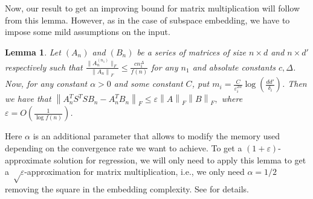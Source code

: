 \documentclass[a4paper,11pt,oneside,english,onecolumn]{article}
\newtheorem{lemma}[theorem]{Lemma}
\theoremstyle{definition}
\newcommand{\bigO}[1]{\ensuremath{O\left( #1 \right)}}
\newcommand{\normF}[1]{\ensuremath{\left\| #1\right\|_F}}
\newcommand{\eps}{\ensuremath{\varepsilon}}
\begin{document}
Now, our result to get an improving bound for matrix multiplication will follow from this lemma. However, as in the case of subspace embedding, we have to impose some mild assumptions on the input.

\begin{lemma}
\label{lemma:ImprovedmatrixMultiplication}
Let $(A_n)$ and $(B_n)$ be a series of matrices of size $n \times d $ and $n \times d'$ respectively such that
$\frac{\|A_n^{(n_1)}\|_F}{\normF{A_n}} \leq \frac{cn_1^\Delta}{f(n)}$
for any $n_1$ and absolute constants $c,\Delta$. Now, for any constant $\alpha>0$ and some constant $C$, put $m_i = \frac{C}{\eps_i^{2\alpha}} \log(\frac{dd'}{\delta_i})$. Then we have that
$\normF{A_n^T S^T S B_n - A_n^T B_n} \leq \eps \normF{A}\normF{B},$
where $\eps = \bigO{\frac{1}{\log f(n)}}$.
\end{lemma}

Here $\alpha$ is an additional parameter that allows to modify the memory used depending on the convergence rate we want to achieve. To get a $(1 + \eps)$-approximate solution for regression, we will only need to apply this lemma to get a $ \sqrt \eps$-approximation for matrix multiplication, i.e., we only need $\alpha = 1/2$ removing the square in the embedding complexity. See \cite{LinAlgStream} for details.
\end{document}
